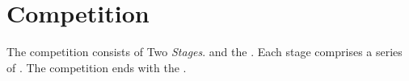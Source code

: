 \section{Competition}
The competition consists of Two \emph{Stages}.
and the \FINAL{}.
Each stage comprises a series of . 
The competition ends with the \FINAL{}.
